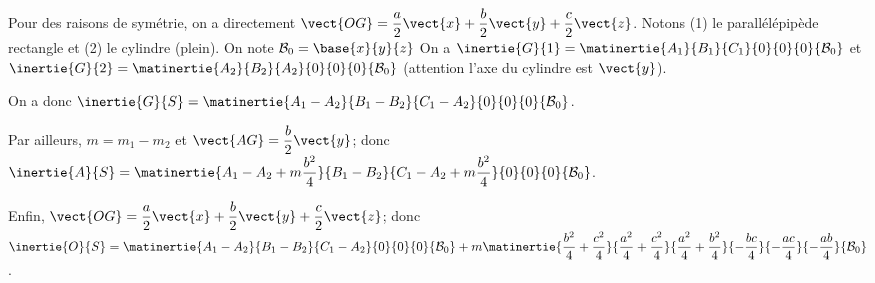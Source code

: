 \begin{corrigebox}
Pour des raisons de symétrie, on a directement $\vect{OG}=\dfrac{a}{2}\vect{x}+\dfrac{b}{2}\vect{y}+\dfrac{c}{2}\vect{z}$.
Notons (1) le parallélépipède rectangle et (2) le cylindre (plein). On note $\mathcal{B}_0=\base{x}{y}{z}$
On a $\inertie{G}{1}=\matinertie{A_1}{B_1}{C_1}{0}{0}{0}{\mathcal{B}_0}$ et
$\inertie{G}{2}=\matinertie{A_2}{B_2}{A_2}{0}{0}{0}{\mathcal{B}_0}$ (attention l'axe du cylindre est $\vect{y}$).

On a donc $\inertie{G}{S}=\matinertie{A_1-A_2}{B_1-B_2}{C_1-A_2}{0}{0}{0}{\mathcal{B}_0}$.

Par ailleurs, $m=m_1-m_2$
et $\vect{AG}=\dfrac{b}{2}\vect{y}$; donc $\inertie{A}{S}=\matinertie{A_1-A_2+m\dfrac{b^2}{4}}{B_1-B_2}{C_1-A_2+m\dfrac{b^2}{4}}{0}{0}{0}{\mathcal{B}_0}$.

Enfin, $\vect{OG}=\dfrac{a}{2}\vect{x}+\dfrac{b}{2}\vect{y}+\dfrac{c}{2}\vect{z}$; donc
 $\inertie{O}{S}=
\matinertie{A_1-A_2}{B_1-B_2}{C_1-A_2}{0}{0}{0}{\mathcal{B}_0}
+m\matinertie{\dfrac{b^2}{4}+\dfrac{c^2}{4}}{\dfrac{a^2}{4}+\dfrac{c^2}{4}}{\dfrac{a^2}{4}+\dfrac{b^2}{4}}{-\dfrac{bc}{4}}{-\dfrac{ac}{4}}{-\dfrac{ab}{4}}{\mathcal{B}_0}$.
\end{corrigebox}
